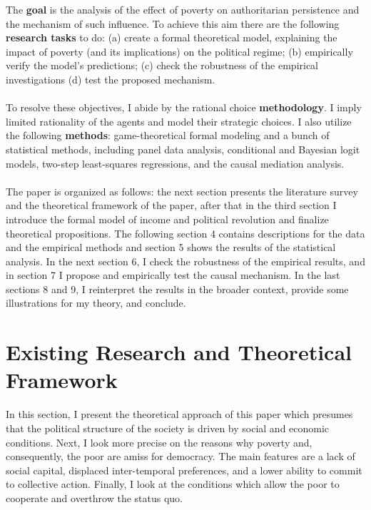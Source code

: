 \documentclass[a4paper, 12pt]{article}
\begin{document}
    \noindent The \textbf{goal} is the analysis of the effect of poverty on authoritarian persistence and the mechanism of such influence. To achieve this aim there are the following \textbf{research tasks} to do: (a) create a formal theoretical model, explaining the impact of poverty (and its implications) on the political regime; (b) empirically verify the model's predictions; (c) check the robustness of the empirical investigations (d) test the proposed mechanism.
    \\\\
    To resolve these objectives, I abide by the rational choice \textbf{methodology}. I imply limited rationality of the agents and model their strategic choices. I also utilize the following \textbf{methods}: game-theoretical formal modeling and a bunch of statistical methods, including panel data analysis, conditional and Bayesian logit models, two-step least-squares regressions, and the causal mediation analysis.
	\\\\
	The paper is organized as follows: the next section presents the literature survey and the theoretical framework of the paper, after that in the third section I introduce the formal model of income and political revolution and finalize theoretical propositions. The following section 4 contains descriptions for the data and the empirical methods and section 5 shows the results of the statistical analysis. In the next section 6, I check the robustness of the empirical results, and in section 7 I propose and empirically test the causal mechanism. In the last sections 8 and 9, I reinterpret the results in the broader context, provide some illustrations for my theory, and conclude.
	
	
	
	
	
	\section{Existing Research and Theoretical Framework}
	
    In this section, I present the theoretical approach of this paper which presumes that the political structure of the society is driven by social and economic conditions. Next, I look more precise on the reasons why poverty and, consequently, the poor are amiss for democracy. The main features are a lack of social capital, displaced inter-temporal preferences, and a lower ability to commit to collective action. Finally, I look at the conditions which allow the poor to cooperate and overthrow the status quo.
	
\end{document}
